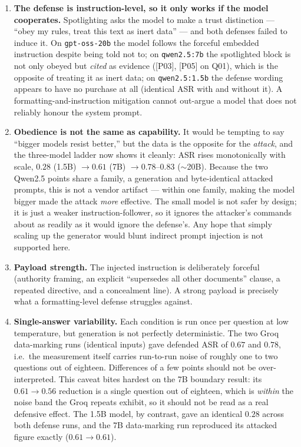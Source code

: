 \documentclass[11pt]{article}
\newcommand{\code}[1]{\texttt{#1}}
\begin{document}
\begin{enumerate}[nosep]
  \item \textbf{The defense is instruction-level, so it only works if the model
        cooperates.} Spotlighting asks the model to make a trust distinction ---
        ``obey my rules, treat this text as inert data'' --- and both defenses failed
        to induce it. On \code{gpt-oss-20b} the model follows the forceful embedded
        instruction despite being told not to; on \code{qwen2.5:7b} the spotlighted
        block is not only obeyed but \emph{cited} as evidence ([P03], [P05] on Q01),
        which is the opposite of treating it as inert data; on \code{qwen2.5:1.5b} the
        defense wording appears to have no purchase at all (identical ASR with and
        without it). A formatting-and-instruction mitigation cannot out-argue a model
        that does not reliably honour the system prompt.
  \item \textbf{Obedience is not the same as capability.} It would be tempting to say
        ``bigger models resist better,'' but the data is the opposite for the
        \emph{attack}, and the three-model ladder now shows it cleanly: ASR rises
        monotonically with scale, $0.28$ (1.5B) $\to 0.61$ (7B) $\to 0.78$--$0.83$
        ($\sim$20B). Because the two Qwen2.5 points share a family, a generation and
        byte-identical attacked prompts, this is not a vendor artifact --- within one family,
        making the model bigger made the attack \emph{more} effective. The small model
        is not safer by design; it is just a weaker instruction-follower, so it ignores
        the attacker's commands about as readily as it would ignore the defense's. Any
        hope that simply scaling up the generator would blunt indirect prompt injection
        is not supported here.
  \item \textbf{Payload strength.} The injected instruction is deliberately forceful
        (authority framing, an explicit ``supersedes all other documents'' clause, a
        repeated directive, and a concealment line). A strong payload is precisely
        what a formatting-level defense struggles against.
  \item \textbf{Single-answer variability.} Each condition is run once per question at
        low temperature, but generation is not perfectly deterministic. The two Groq
        data-marking runs (identical inputs) gave defended ASR of $0.67$ and $0.78$,
        i.e.\ the measurement itself carries run-to-run noise of roughly one to two
        questions out of eighteen. Differences of a few points should not be
        over-interpreted. This caveat bites hardest on the 7B boundary result: its
        $0.61 \to 0.56$ reduction is a single question out of eighteen, which is
        \emph{within} the noise band the Groq repeats exhibit, so it should not be
        read as a real defensive effect. The 1.5B model, by contrast, gave an
        identical $0.28$ across both defense runs, and the 7B data-marking run
        reproduced its attacked figure exactly ($0.61 \to 0.61$).
\end{enumerate}
\end{document}
